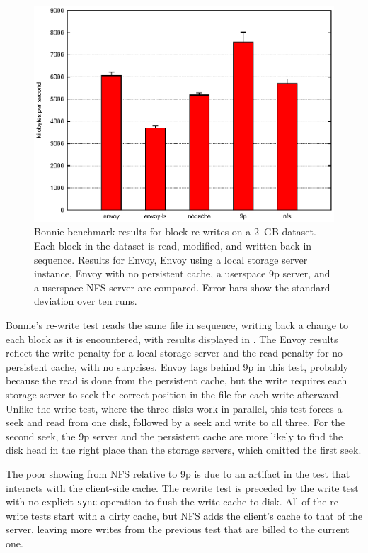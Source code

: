 \begin{figure}[t]
\centering
\includegraphics[width=\figwidth]{figures/bonnie-druid1-rewrite}
\caption[Bonnie benchmark results for block re-writes]{Bonnie benchmark results for block re-writes on a 2~GB dataset. Each block in the dataset is read, modified, and written back in sequence. Results for Envoy, Envoy using a local storage server instance, Envoy with no persistent cache, a userspace 9p server, and a userspace NFS server are compared. Error bars show the standard deviation over ten runs.}
\label{fig:bonnie-druid1-rewrite}
\end{figure}

Bonnie's re-write test reads the same file in sequence, writing back a change to each block as it is encountered, with results displayed in . The Envoy results reflect the write penalty for a local storage server and the read penalty for no persistent cache, with no surprises. Envoy lags behind 9p in this test, probably because the read is done from the persistent cache, but the write requires each storage server to seek the correct position in the file for each write afterward. Unlike the write test, where the three disks work in parallel, this test forces a seek and read from one disk, followed by a seek and write to all three. For the second seek, the 9p server and the persistent cache are more likely to find the disk head in the right place than the storage servers, which omitted the first seek.

The poor showing from NFS relative to 9p is due to an artifact in the test that interacts with the client-side cache. The rewrite test is preceded by the write test with no explicit \texttt{sync} operation to flush the write cache to disk. All of the re-write tests start with a dirty cache, but NFS adds the client's cache to that of the server, leaving more writes from the previous test that are billed to the current one.

